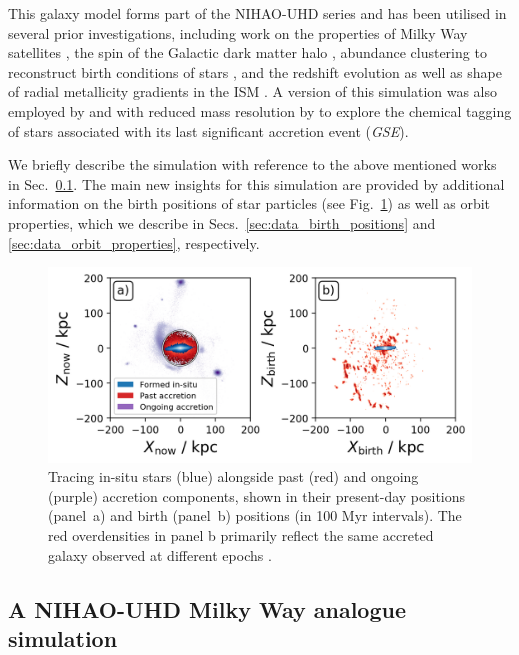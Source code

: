 \documentclass[fleqn,usenatbib]{mnras}
\begin{document}
This galaxy model forms part of the NIHAO-UHD series \citep{Buck2020b} and has been utilised in several prior investigations, including work on the properties of Milky Way satellites \citep{Buck2019b}, the spin of the Galactic dark matter halo \citep{Obreja2022}, abundance clustering to reconstruct birth conditions of stars \citep{Ratcliffe2022}, and the redshift evolution as well as shape of radial metallicity gradients in the ISM \citep{Ratcliffe2025, Buder2025}. A version of this simulation was also employed by \citet{Buck2023} and with reduced mass resolution by \citet{Buder2024} to explore the chemical tagging of stars associated with its last significant accretion event (\textit{GSE}).

We briefly describe the simulation with reference to the above mentioned works in Sec.~\ref{sec:data_simulation}. The main new insights for this simulation are provided by additional information on the birth positions of star particles (see Fig.~\ref{fig:tracing_insitu_accretion_2}) as well as orbit properties, which we describe in Secs.~\ref{sec:data_birth_positions} and \ref{sec:data_orbit_properties}, respectively.

\begin{figure}
    \centering
    \includegraphics[width=\columnwidth]{figures/tracing_insitu_accretion_2.png}
    \caption{Tracing in-situ stars (blue) alongside past (red) and ongoing (purple) accretion components, shown in their present-day positions (panel~a) and birth (panel~b) positions (in 100 Myr intervals). The red overdensities in panel b primarily reflect the same accreted galaxy observed at different epochs \href{https://github.com/svenbuder/gse_nihaouhd/tree/main/figures}{\faGithub}.}
    \label{fig:tracing_insitu_accretion_2}
\end{figure}

\subsection{A NIHAO-UHD Milky Way analogue simulation} \label{sec:data_simulation}
\end{document}
